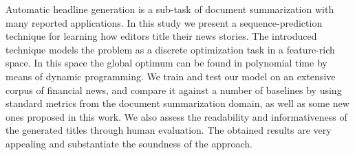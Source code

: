 Automatic headline generation is a sub-task of document summarization with many reported applications. In this study we present a sequence-prediction technique for learning how editors title their news stories. The introduced technique models the problem as a discrete optimization task in a feature-rich space. In this space the global optimum can be found in polynomial time by means of dynamic programming. We train and test our model on an extensive corpus of financial news, and compare it against a number of baselines by using standard metrics from the document summarization domain, as well as some new ones proposed in this work. We also assess the readability and informativeness of the generated titles through human evaluation. The obtained results are very appealing and substantiate the soundness of the approach.
